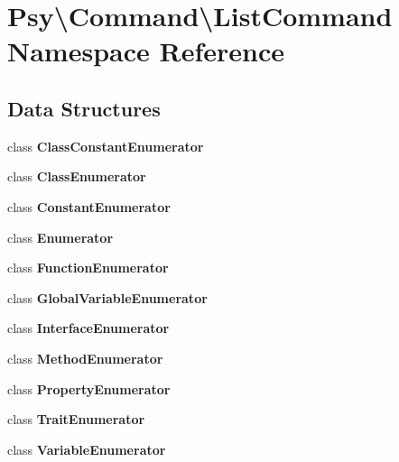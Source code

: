 \section{Psy\textbackslash{}Command\textbackslash{}List\+Command Namespace Reference}
\label{namespace_psy_1_1_command_1_1_list_command}
\subsection*{Data Structures}
\begin{DoxyCompactItemize}
\item 
class {\bf Class\+Constant\+Enumerator}
\item 
class {\bf Class\+Enumerator}
\item 
class {\bf Constant\+Enumerator}
\item 
class {\bf Enumerator}
\item 
class {\bf Function\+Enumerator}
\item 
class {\bf Global\+Variable\+Enumerator}
\item 
class {\bf Interface\+Enumerator}
\item 
class {\bf Method\+Enumerator}
\item 
class {\bf Property\+Enumerator}
\item 
class {\bf Trait\+Enumerator}
\item 
class {\bf Variable\+Enumerator}
\end{DoxyCompactItemize}
